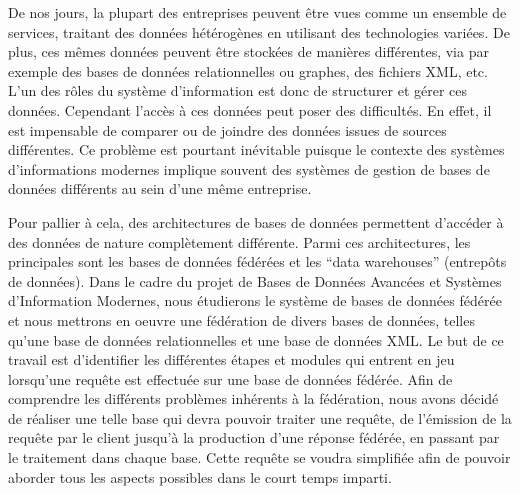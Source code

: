 De nos jours, la plupart des entreprises peuvent être vues comme un ensemble de services, traitant des données hétérogènes en utilisant des technologies variées. De plus, ces mêmes données peuvent être stockées de manières différentes, via par exemple des bases de données relationnelles ou graphes, des fichiers XML, etc. L’un des rôles du système d’information est donc de structurer et gérer ces données. Cependant l’accès à ces données peut poser des difficultés. En effet, il est impensable de comparer ou de joindre des données issues de  sources différentes. Ce problème est pourtant inévitable puisque le contexte des systèmes d’informations modernes implique souvent des systèmes de gestion de bases de données différents au sein d’une même entreprise.

Pour pallier à cela, des architectures de bases de données permettent d'accéder à des données de nature complètement différente. Parmi ces architectures, les principales sont les bases de données fédérées et les “data warehouses” (entrepôts de données). Dans le cadre du projet de Bases de Données Avancées et Systèmes d’Information Modernes, nous étudierons le système de bases de données fédérée et nous mettrons en oeuvre une fédération de divers bases de données, telles qu’une base de données relationnelles et une base de données XML. Le but de ce travail est d'identifier les différentes étapes et modules qui entrent en jeu lorsqu'une requête est effectuée sur une base de données fédérée. Afin de comprendre les différents problèmes inhérents à la fédération, nous avons décidé de réaliser une telle base qui devra pouvoir traiter une requête, de l'émission de la requête par le client jusqu'à la production d'une réponse fédérée, en passant par le traitement dans chaque base. Cette requête se voudra simplifiée afin de pouvoir aborder tous les aspects possibles dans le court temps imparti.